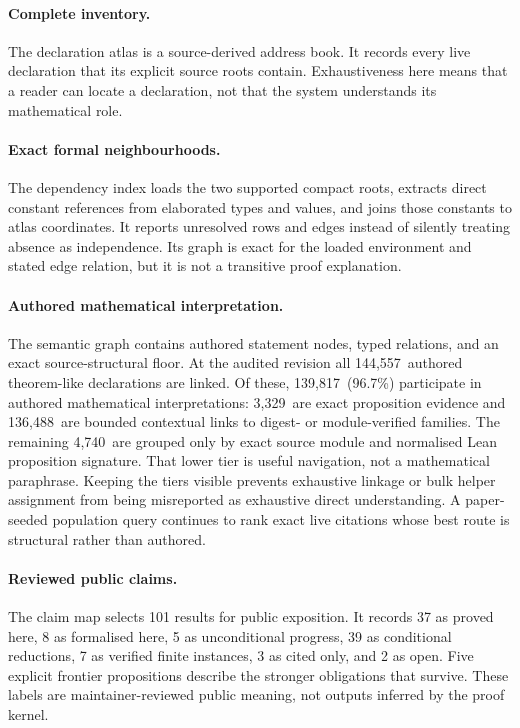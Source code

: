 \documentclass[11pt]{article}
\newcommand{\SemanticAuthoredTheoremLike}{144,557}
\newcommand{\SemanticAuthoredInterpreted}{139,817}
\newcommand{\SemanticDirectEvidence}{3,329}
\newcommand{\SemanticContextual}{136,488}
\newcommand{\SemanticStructuralOnly}{4,740}
\newcommand{\SemanticAuthoredPercent}{96.7}
\begin{document}
\paragraph{Complete inventory.}
The declaration atlas is a source-derived address book. It records every live
declaration that its explicit source roots contain. Exhaustiveness here means
that a reader can locate a declaration, not that the system understands its
mathematical role.

\paragraph{Exact formal neighbourhoods.}
The dependency index loads the two supported compact roots, extracts direct
constant references from elaborated types and values, and joins those
constants to atlas coordinates. It reports unresolved rows and edges instead
of silently treating absence as independence. Its graph is exact for the
loaded environment and stated edge relation, but it is not a transitive proof
explanation.

\paragraph{Authored mathematical interpretation.}
The semantic graph contains authored statement nodes, typed relations, and an
exact source-structural floor. At the audited revision all
\SemanticAuthoredTheoremLike\ authored theorem-like declarations are linked.
Of these, \SemanticAuthoredInterpreted\ (\SemanticAuthoredPercent\%) participate
in authored mathematical interpretations: \SemanticDirectEvidence\ are exact
proposition evidence and \SemanticContextual\ are bounded contextual links to
digest- or module-verified families. The remaining \SemanticStructuralOnly\ are grouped only by exact source
module and normalised Lean proposition signature. That lower tier is useful
navigation, not a mathematical paraphrase. Keeping the tiers visible prevents
exhaustive linkage or bulk helper assignment from being misreported as
exhaustive direct understanding. A paper-seeded population query continues to
rank exact live citations whose best route is structural rather than authored.

\paragraph{Reviewed public claims.}
The claim map selects 101 results for public exposition. It records 37 as
proved here, 8 as formalised here, 5 as unconditional progress, 39 as
conditional reductions, 7 as verified finite instances, 3 as cited only, and
2 as open. Five explicit frontier propositions describe the stronger
obligations that survive. These labels are maintainer-reviewed public meaning,
not outputs inferred by the proof kernel.
\end{document}
